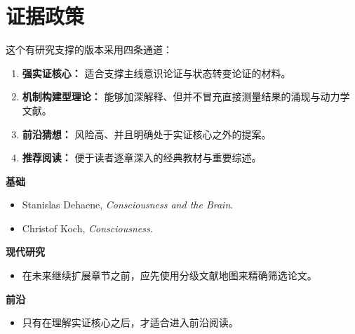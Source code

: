 \section{证据政策}

这个有研究支撑的版本采用四条通道：
\begin{enumerate}[nosep]
  \item \textbf{强实证核心：} 适合支撑主线意识论证与状态转变论证的材料。
  \item \textbf{机制构建型理论：} 能够加深解释、但并不冒充直接测量结果的涌现与动力学文献。
  \item \textbf{前沿猜想：} 风险高、并且明确处于实证核心之外的提案。
  \item \textbf{推荐阅读：} 便于读者逐章深入的经典教材与重要综述。
\end{enumerate}

\begin{readingbox}
\textbf{基础}
\begin{itemize}[nosep]
  \item Stanislas Dehaene, \emph{Consciousness and the Brain}.
  \item Christof Koch, \emph{Consciousness}.
\end{itemize}
\textbf{现代研究}
\begin{itemize}[nosep]
  \item 在未来继续扩展章节之前，应先使用分级文献地图来精确筛选论文。
\end{itemize}
\textbf{前沿}
\begin{itemize}[nosep]
  \item 只有在理解实证核心之后，才适合进入前沿阅读。
\end{itemize}
\end{readingbox}